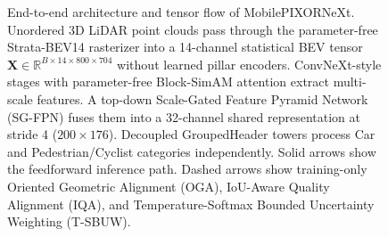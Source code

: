 \begin{figure}[t]
    \centering
    \caption{End-to-end architecture and tensor flow of MobilePIXORNeXt. Unordered 3D LiDAR point clouds pass through the parameter-free Strata-BEV14 rasterizer into a 14-channel statistical BEV tensor $\mathbf{X} \in \mathbb{R}^{B \times 14 \times 800 \times 704}$ without learned pillar encoders. ConvNeXt-style stages with parameter-free Block-SimAM attention extract multi-scale features. A top-down Scale-Gated Feature Pyramid Network (SG-FPN) fuses them into a 32-channel shared representation at stride 4 ($200 \times 176$). Decoupled GroupedHeader towers process Car and Pedestrian/Cyclist categories independently. Solid arrows show the feedforward inference path. Dashed arrows show training-only Oriented Geometric Alignment (OGA), IoU-Aware Quality Alignment (IQA), and Temperature-Softmax Bounded Uncertainty Weighting (T-SBUW).}
    \label{fig:r37_overview}
\end{figure}

